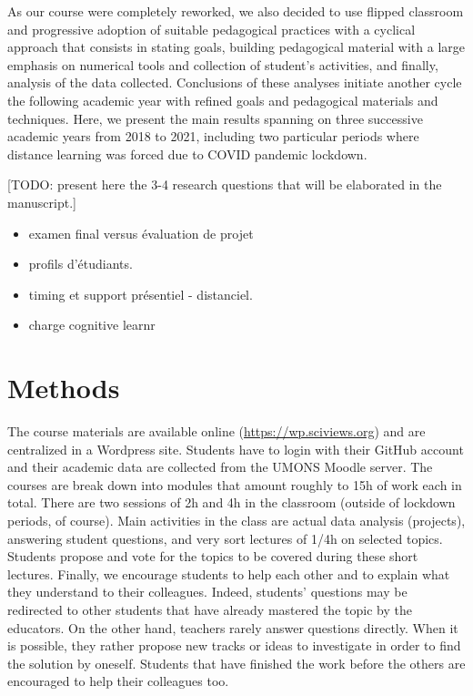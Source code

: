 \documentclass[
]{article}
\begin{document}
As our course were completely reworked, we also decided to use flipped
classroom and progressive adoption of suitable pedagogical practices
with a cyclical approach that consists in stating goals, building
pedagogical material with a large emphasis on numerical tools and
collection of student's activities, and finally, analysis of the data
collected. Conclusions of these analyses initiate another cycle the
following academic year with refined goals and pedagogical materials and
techniques. Here, we present the main results spanning on three
successive academic years from 2018 to 2021, including two particular
periods where distance learning was forced due to COVID pandemic
lockdown.

{[}TODO: present here the 3-4 research questions that will be elaborated
in the manuscript.{]}

\begin{itemize}
\item
  examen final versus évaluation de projet
\item
  profils d'étudiants.
\item
  timing et support présentiel - distanciel.
\item
  charge cognitive learnr
\end{itemize}

\hypertarget{methods}{%
\section{Methods}\label{methods}}

The course materials are available online
(\url{https://wp.sciviews.org}) and are centralized in a Wordpress site.
Students have to login with their GitHub account and their academic data
are collected from the UMONS Moodle server. The courses are break down
into modules that amount roughly to 15h of work each in total. There are
two sessions of 2h and 4h in the classroom (outside of lockdown periods,
of course). Main activities in the class are actual data analysis
(projects), answering student questions, and very sort lectures of 1/4h
on selected topics. Students propose and vote for the topics to be
covered during these short lectures. Finally, we encourage students to
help each other and to explain what they understand to their colleagues.
Indeed, students' questions may be redirected to other students that
have already mastered the topic by the educators. On the other hand,
teachers rarely answer questions directly. When it is possible, they
rather propose new tracks or ideas to investigate in order to find the
solution by oneself. Students that have finished the work before the
others are encouraged to help their colleagues too.
\end{document}

